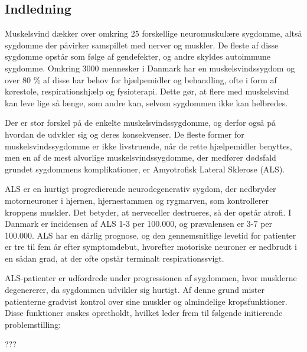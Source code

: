 \subsection{Indledning}
Muskelsvind dækker over omkring 25 forskellige neuromuskulære sygdomme, altså sygdomme der påvirker samspillet med nerver og muskler. De fleste af disse sygdomme opstår som følge af gendefekter, og andre skyldes autoimmune sygdomme. Omkring 3000 mennesker i Danmark har en muskelsvindssygdom og over 80 \% af disse har behov for hjælpemidler og behandling, ofte i form af kørestole, respirationshjælp og fysioterapi. Dette gør, at flere med muskelsvind kan leve lige så længe, som andre kan, selvom sygdommen ikke kan helbredes. \citep{hvadermuskelsvind2016,sygdomsbeskrivelser2016}

Der er stor forskel på de enkelte muskelsvindssygdomme, og derfor også på hvordan de udvkler sig og deres konsekvenser. De fleste former for muskelsvindssygdomme er ikke livstruende, når de rette hjælpemidler benyttes, men en af de mest alvorlige muskelsvindssygdomme, der medfører dødsfald grundet sygdommens komplikationer, er Amyotrofisk Lateral Sklerose (ALS).  \citep{hvadermuskelsvind2016}

ALS er en hurtigt progredierende neurodegenerativ sygdom, der nedbryder motorneuroner i hjernen, hjernestammen og rygmarven, som kontrollerer kroppens muskler. Det betyder, at nerveceller destrueres, så der opstår atrofi. I Danmark er incidensen af ALS 1-3 per 100.000, og prævalensen er 3-7 per 100.000. ALS har en dårlig prognose, og den gennemsnitlige levetid for patienter er tre til fem år efter symptomdebut, hvorefter motoriske neuroner er nedbrudt i en sådan grad, at der ofte opstår terminalt respirationssvigt. \citep{russell2015, morris2015}

ALS-patienter er udfordrede under progressionen af sygdommen, hvor musklerne degenererer, da sygdommen udvikler sig hurtigt. Af denne grund mister patienterne gradvist kontrol over sine muskler og almindelige kropsfunktioner. Disse funktioner ønskes opretholdt, hvilket leder frem til følgende initierende problemstilling:

??? 

